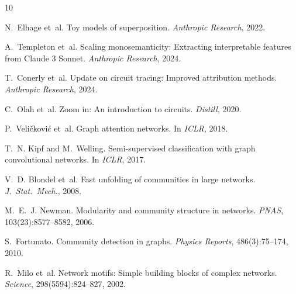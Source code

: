 \documentclass[10pt,twocolumn]{article}
\begin{document}

\begin{thebibliography}{10}

N.~Elhage et~al.
\newblock Toy models of superposition.
\newblock \textit{Anthropic Research}, 2022.

A.~Templeton et~al.
\newblock Scaling monosemanticity: Extracting interpretable features from {Claude} 3 {Sonnet}.
\newblock \textit{Anthropic Research}, 2024.

T.~Conerly et~al.
\newblock Update on circuit tracing: Improved attribution methods.
\newblock \textit{Anthropic Research}, 2024.

C.~Olah et~al.
\newblock Zoom in: An introduction to circuits.
\newblock \textit{Distill}, 2020.

P.~Veli{\v{c}}kovi{\'c} et~al.
\newblock Graph attention networks.
\newblock In \textit{ICLR}, 2018.

T.~N. Kipf and M.~Welling.
\newblock Semi-supervised classification with graph convolutional networks.
\newblock In \textit{ICLR}, 2017.

V.~D. Blondel et~al.
\newblock Fast unfolding of communities in large networks.
\newblock \textit{J.\ Stat.\ Mech.}, 2008.

M.~E.~J. Newman.
\newblock Modularity and community structure in networks.
\newblock \textit{PNAS}, 103(23):8577--8582, 2006.

S.~Fortunato.
\newblock Community detection in graphs.
\newblock \textit{Physics Reports}, 486(3):75--174, 2010.

R.~Milo et~al.
\newblock Network motifs: Simple building blocks of complex networks.
\newblock \textit{Science}, 298(5594):824--827, 2002.

\end{thebibliography}
\end{document}
